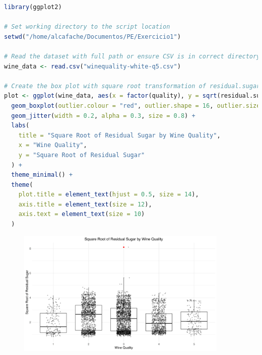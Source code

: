 \documentclass[11pt,a4paper]{article}
\begin{document}
\begin{lstlisting}[language=R]
library(ggplot2)

# Set working directory to the script location
setwd("/home/alcafache/Documentos/PE/Exercicio1")

# Read the dataset with full path or ensure CSV is in correct directory
wine_data <- read.csv("winequality-white-q5.csv")

# Create the box plot with square root transformation of residual.sugar
plot <- ggplot(wine_data, aes(x = factor(quality), y = sqrt(residual.sugar))) +
  geom_boxplot(outlier.colour = "red", outlier.shape = 16, outlier.size = 2) +
  geom_jitter(width = 0.2, alpha = 0.3, size = 0.8) +
  labs(
    title = "Square Root of Residual Sugar by Wine Quality",
    x = "Wine Quality",
    y = "Square Root of Residual Sugar"
  ) +
  theme_minimal() +
  theme(
    plot.title = element_text(hjust = 0.5, size = 14),
    axis.title = element_text(size = 12),
    axis.text = element_text(size = 10)
  )
\end{lstlisting}

\begin{figure}[htbp]
    \centering
    \includegraphics[width=0.9\textwidth]{wine_quality_boxplot.png}
\end{figure}
\end{document}
